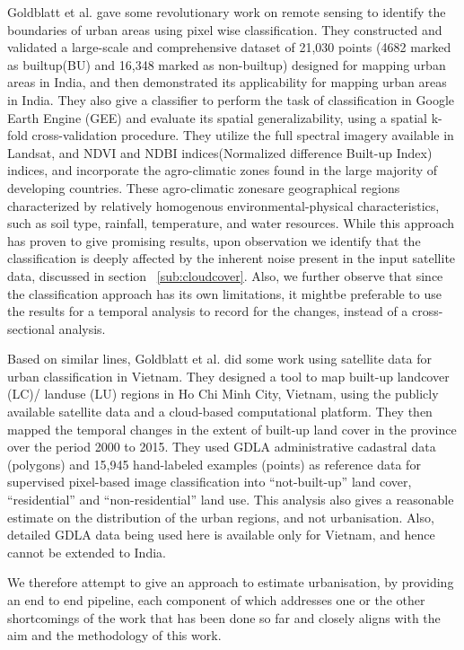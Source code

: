 Goldblatt et al.\cite{goldblatt2016detecting} gave some revolutionary work on remote sensing to identify the boundaries of urban areas using pixel wise classification. They constructed and validated a large-scale and comprehensive dataset of 21,030 points (4682 marked as builtup(BU) and 16,348 marked as non-builtup) designed for mapping urban areas in India, and then demonstrated its applicability for mapping urban areas in India. They also give a classifier to perform the task of classification in Google Earth Engine (GEE) and evaluate its spatial generalizability, using a spatial k-fold cross-validation procedure. They utilize the full spectral imagery available in Landsat, and NDVI and NDBI indices(Normalized difference Built-up Index) indices, and incorporate the agro-climatic zones found in the large majority of developing countries. These agro-climatic zonesare geographical regions characterized by relatively homogenous environmental-physical characteristics, such as soil type, rainfall, temperature, and water resources. While this approach has proven to give promising results, upon observation we identify that the classification is deeply affected by the inherent noise present in the input satellite data, discussed in section ~\ref{sub:cloudcover}. Also, we further observe that since the classification approach has its own limitations, it mightbe preferable to use the results for a temporal analysis to record for the changes, instead of a cross-sectional analysis.

Based on similar lines, Goldblatt et al.\cite{vietnam} did some work using satellite data for urban classification in Vietnam. They designed a tool to map built-up landcover (LC)/ landuse (LU) regions in Ho Chi Minh City, Vietnam, using the publicly available satellite data and a cloud-based computational platform. They then mapped the temporal changes in the extent of built-up land cover in the province over the period 2000 to 2015. They used GDLA administrative cadastral data (polygons) and 15,945 hand-labeled examples (points) as reference data for supervised pixel-based image classification into “not-built-up” land cover, “residential” and “non-residential” land use. This analysis also gives a reasonable estimate on the distribution of the urban regions, and not urbanisation. Also, detailed GDLA data being used here is available only for Vietnam, and hence cannot be extended to India.

We therefore attempt to give an approach to estimate urbanisation, by providing an end to end pipeline, each component of which addresses one or the other shortcomings of the work that has been done so far and closely aligns with the aim and the methodology of this work.